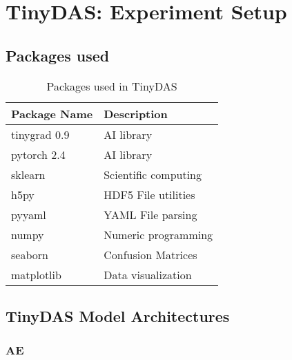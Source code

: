 \chapter{TinyDAS: Experiment Setup}
\label{app:tinydas-exp}




\section{Packages used}
\label{app:tinypacks}

\begin{table}[!htbp]
\centering
\caption{Packages used in TinyDAS}
\label{tab:tinydas-packages}
\small
\begin{tabular}{>{\raggedright\arraybackslash}p{}>{\raggedright\arraybackslash}p{}}
\toprule
\textbf{Package Name} & \textbf{Description} \\
\midrule
\rowcolor{gray!10} tinygrad 0.9 & AI library \\
pytorch 2.4 & AI library \\
\rowcolor{gray!10} sklearn & Scientific computing \\
h5py & HDF5 File utilities \\
\rowcolor{gray!10} pyyaml & YAML File parsing \\
numpy & Numeric programming \\
\rowcolor{gray!10} seaborn & Confusion Matrices \\
matplotlib & Data visualization \\
\bottomrule
\end{tabular}
\end{table}


\section{TinyDAS Model Architectures}
\label{app:archs}

\subsection{AE}
\label{app:a-ae}

